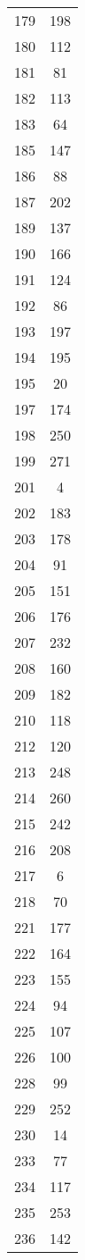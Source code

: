 \documentclass[10pt,letterpaper]{article}\usepackage[]{graphicx}\usepackage[]{color}
\begin{document}
\begin{center}
\begin{longtable}[c]{cc}
		179	& 198 \\
		180	& 112 \\
		181	& 81 \\
		182	& 113 \\
		183	& 64 \\
		185	& 147 \\
		186	& 88 \\
		187	& 202 \\
		189	& 137 \\
		190	& 166 \\
		191	& 124 \\
		192	& 86 \\
		193	& 197 \\
		194	& 195 \\
		195	& 20 \\
		197	& 174 \\
		198	& 250 \\
		199	& 271 \\
		201	& 4 \\
		202	& 183 \\
		203	& 178 \\
		204	& 91 \\
		205	& 151 \\
		206	& 176 \\
		207	& 232 \\
		208	& 160 \\
		209	& 182 \\
		210	& 118 \\
		212	& 120 \\
		213	& 248 \\
		214	& 260 \\
		215	& 242 \\
		216	& 208 \\
		217	& 6 \\
		218	& 70 \\
		221	& 177 \\
		222	& 164 \\
		223	& 155 \\
		224	& 94 \\
		225	& 107 \\
		226	& 100 \\
		228	& 99 \\
		229	& 252 \\
		230	& 14 \\
		233	& 77 \\
		234	& 117 \\
		235	& 253 \\
		236	& 142 \\

\end{longtable}
\end{center}
\end{document}

